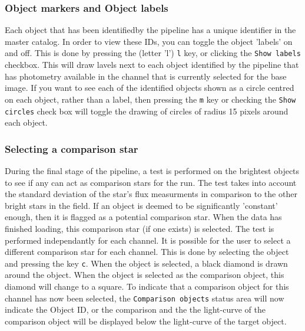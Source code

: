 \subsubsection{Object markers and Object labels}
Each object that has been identifiedby the pipeline has a unique identifier in the master catalog. In order to view these IDs, you can toggle the object 'labels' on and off. This is done by pressing the (letter 'l') \texttt{l} key, or clicking the \texttt{Show labels} checkbox. This will draw lavels next to each object identified by the pipeline that has photometry available in the channel that is currently selected for the base image. If you want to see each of the identified objects shown as a circle centred on each object, rather than a label, then pressing the \texttt{m} key or checking the \texttt{Show circles} check box will toggle the drawing of circles of radius 15 pixels around each object.   

\subsubsection{Selecting a comparison star}
During the final stage of the pipeline, a test is performed on the brightest objects to see if any can act as comparison stars for the run. The test takes into account the standard deviation of the star's flux measurments in comparison to the other bright stars in the field. If an object is deemed to be significantly 'constant' enough, then it is flagged as a potential comparison star. When the data has finished loading, this comparison star (if one exists) is selected. The test is performed independantly for each channel. It is possible for the user to select a different comparison star for each channel. This is done by selecting the object and pressing the key \texttt{c}. When the object is selected, a black diamond is drawn around the object. When the object is selected as the comparison object, this diamond will change to a square. To indicate that a comparison object for this channel has now been selected, the \texttt{Comparison objects} status area will now indicate the Object ID, or the comparison and the the light-curve of the comparison object will be displayed below the light-curve of the target object.

